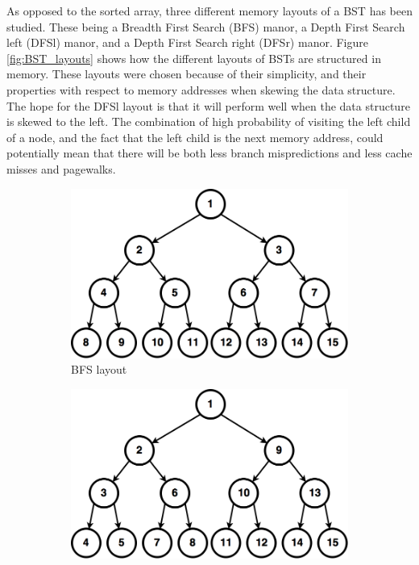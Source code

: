 \documentclass{article}
\begin{document}
As opposed to the sorted array, three different memory layouts of a BST has been studied. These being a Breadth First Search (BFS) manor, a Depth First Search left (DFSl) manor, and a Depth First Search right (DFSr) manor. Figure \ref{fig:BST_layouts} shows how the different layouts of BSTs are structured in memory. These layouts were chosen because of their simplicity, and their properties with respect to memory addresses when skewing the data structure. The hope for the DFSl layout is that it will perform well when the data structure is skewed to the left. The combination of high probability of visiting the left child of a node, and the fact that the left child is the next memory address, could potentially mean that there will be both less branch mispredictions and less cache misses and pagewalks.

\begin{figure}[H]
  \centering
  \begin{subfigure}[b]{0.51\textwidth}
  	\includegraphics[width=\textwidth]{figures/BFS_layout}
  	\caption{BFS layout}
  \end{subfigure}
  \begin{subfigure}[b]{0.49\textwidth}
    \includegraphics[width=\textwidth]{figures/DFSl_layout}	

\end{subfigure}
\end{figure}
\end{document}
